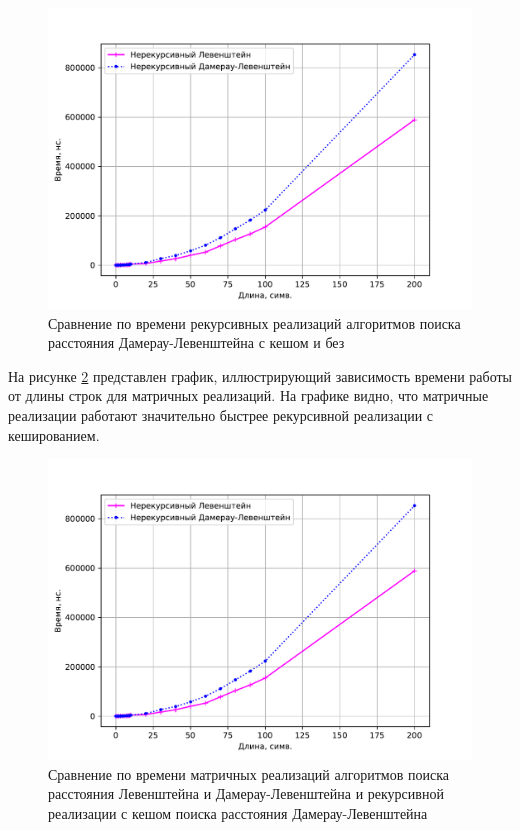 \begin{figure}[h]
	\centering
	\includegraphics[height=0.5\textheight, page=2]{img/figures.pdf}
	\caption{Сравнение по времени рекурсивных реализаций алгоритмов поиска расстояния Дамерау-Левенштейна с кешом и без}
	\label{plt:time_02}
\end{figure}

На рисунке \ref{plt:time_03} представлен график, иллюстрирующий зависимость времени работы от длины строк для матричных реализаций. На графике видно, что матричные реализации работают значительно быстрее рекурсивной реализации с кешированием. 

\begin{figure}[h]
	\centering
	\includegraphics[height=0.5\textheight, page=3]{img/figures.pdf}
	\caption{Сравнение по времени матричных реализаций алгоритмов поиска расстояния Левенштейна и Дамерау-Левенштейна и рекурсивной реализации с кешом поиска расстояния Дамерау-Левенштейна}
	\label{plt:time_03}
\end{figure}

